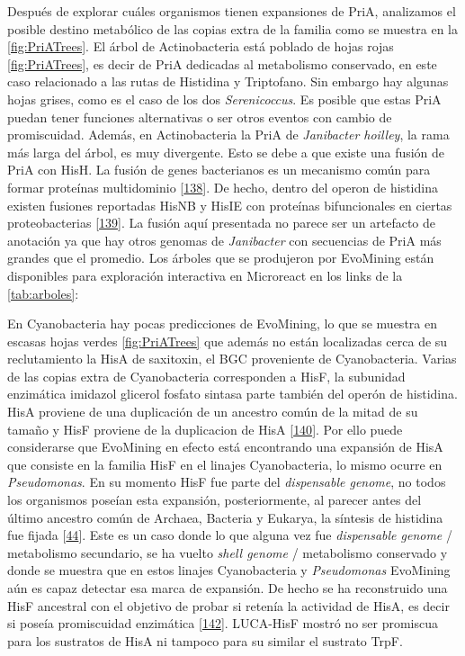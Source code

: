\documentclass[12pt,twoside]{reedthesis}
\begin{document}
  Después de explorar cuáles organismos tienen expansiones de PriA,
  analizamos el posible destino metabólico de las copias extra de la
  familia como se muestra en la \autoref{fig:PriATrees}. El árbol de
  Actinobacteria está poblado de hojas rojas \autoref{fig:PriATrees}, es
  decir de PriA dedicadas al metabolismo conservado, en este caso
  relacionado a las rutas de Histidina y Triptofano. Sin embargo hay
  algunas hojas grises, como es el caso de los dos \emph{Serenicoccus}. Es
  posible que estas PriA puedan tener funciones alternativas o ser otros
  eventos con cambio de promiscuidad. Además, en Actinobacteria la PriA de
  \emph{Janibacter hoilley}, la rama más larga del árbol, es muy
  divergente. Esto se debe a que existe una fusión de PriA con HisH. La
  fusión de genes bacterianos es un mecanismo común para formar proteínas
  multidominio {[}\protect\hyperlink{ref-pasek_gene_2006}{138}{]}. De
  hecho, dentro del operon de histidina existen fusiones reportadas HisNB
  y HisIE con proteínas bifuncionales en ciertas proteobacterias
  {[}\protect\hyperlink{ref-fani_origin_2005}{139}{]}. La fusión aquí
  presentada no parece ser un artefacto de anotación ya que hay otros
  genomas de \emph{Janibacter} con secuencias de PriA más grandes que el
  promedio. Los árboles que se produjeron por EvoMining están disponibles
  para exploración interactiva en Microreact en los links de la
  \autoref{tab:arboles}:
  
  En Cyanobacteria hay pocas predicciones de EvoMining, lo que se muestra
  en escasas hojas verdes \autoref{fig:PriATrees} que además no están
  localizadas cerca de su reclutamiento la HisA de saxitoxin, el BGC
  proveniente de Cyanobacteria. Varias de las copias extra de
  Cyanobacteria corresponden a HisF, la subunidad enzimática imidazol
  glicerol fosfato sintasa parte también del operón de histidina. HisA
  proviene de una duplicación de un ancestro común de la mitad de su
  tamaño y HisF proviene de la duplicacion de HisA
  {[}\protect\hyperlink{ref-fani_evolution_1994}{140}{]}. Por ello puede
  considerarse que EvoMining en efecto está encontrando una expansión de
  HisA que consiste en la familia HisF en el linajes Cyanobacteria, lo
  mismo ocurre en \emph{Pseudomonas}. En su momento HisF fue parte del
  \emph{dispensable genome}, no todos los organismos poseían esta
  expansión, posteriormente, al parecer antes del último ancestro común de
  Archaea, Bacteria y Eukarya, la síntesis de histidina fue fijada
  {[}\protect\hyperlink{ref-fondi_evolution_2009}{44}{]}. Este es un caso
  donde lo que alguna vez fue \emph{dispensable genome} / metabolismo
  secundario, se ha vuelto \emph{shell genome} / metabolismo conservado y
  donde se muestra que en estos linajes Cyanobacteria y \emph{Pseudomonas}
  EvoMining aún es capaz detectar esa marca de expansión. De hecho se ha
  reconstruido una HisF ancestral con el objetivo de probar si retenía la
  actividad de HisA, es decir si poseía promiscuidad enzimática
  {[}\protect\hyperlink{ref-merkl_reconstruction_2016}{142}{]}. LUCA-HisF
  mostró no ser promiscua para los sustratos de HisA ni tampoco para su
  similar el sustrato TrpF.
  
\end{document}
